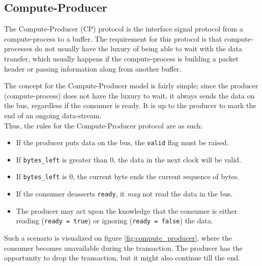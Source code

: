 \subsection{Compute-Producer}
The Compute-Producer (CP) protocol is the interface signal protocol from a
compute-process to a buffer. The requirement for this protocol is that
compute-processes do not usually have the luxury of being able to wait with the
data transfer, which usually happens if the compute-process is building a
packet header or passing information along from another buffer.

The concept for the Compute-Producer model is fairly simple; since the producer
(compute-process) does not have the luxury to wait, it always sends the data
on the bus, regardless if the consumer is ready. It is up to the producer to
mark the end of an ongoing data-stream.\\

Thus, the rules for the Compute-Producer protocol are as such:
\begin{itemize}
	\item If the producer puts data on the bus, the \texttt{valid} flag
		must be raised.
	\item If \texttt{bytes\_left} is greater than $0$, the data in the next
		clock will be valid.
	\item If \texttt{bytes\_left} is $0$, the current byte ends the
		current sequence of bytes.
	\item If the consumer deasserts \texttt{ready}, it \textit{may} not read the
		data in the bus.
	\item The producer may act upon the knowledge that the consumer is
		either reading (\texttt{ready = true}) or ignoring
		(\texttt{ready = false}) the data.
\end{itemize}

Such a scenario is visualized on figure \ref{fig:compute_producer}, where the
consumer becomes unavailable during the transaction. The producer has the
opportunity to drop the transaction, but it might also continue till the end.

